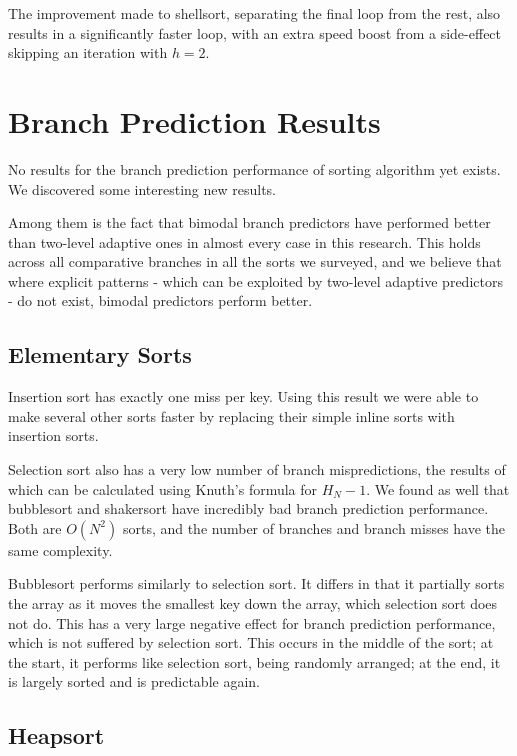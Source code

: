 The improvement made to shellsort, separating the final loop from the rest, also
results in a significantly faster loop, with an extra speed boost from a
side-effect skipping an iteration with $h = 2$.


\section{Branch Prediction Results}


No results for the branch prediction performance of sorting algorithm yet
exists. We discovered some interesting new results. 

Among them is the fact that bimodal branch predictors have performed better than
two-level adaptive ones in almost every case in this research. This holds across
all comparative branches in all the sorts we surveyed, and we believe that where
explicit patterns - which can be exploited by two-level adaptive predictors - do
not exist, bimodal predictors perform better.


\subsection{Elementary Sorts}

Insertion sort has exactly one miss per key. Using this result we were able to
make several other sorts faster by replacing their simple inline sorts with
insertion sorts.

Selection sort also has a very low number of branch mispredictions, the results
of which can be calculated using Knuth's formula for $H_N-1$. We found as well
that bubblesort and shakersort have incredibly bad branch prediction
performance. Both are $O(N^2)$ sorts, and the number of branches and branch
misses have the same complexity.

Bubblesort performs similarly to selection sort. It differs in that it partially
sorts the array as it moves the smallest key down the array, which selection sort
does not do. This has a very large negative effect for branch prediction
performance, which is not suffered by selection sort. This occurs in the middle
of the sort; at the start, it performs like selection sort, being randomly
arranged; at the end, it is largely sorted and is predictable again.

\subsection{Heapsort}

